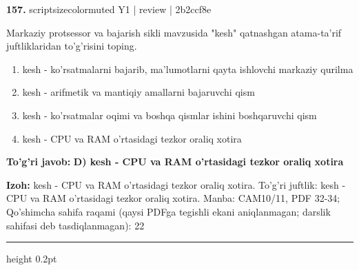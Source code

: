 \documentclass[10pt,a4paper]{article}
\begin{document}
{\bfseries\sffamily\color{ink} 157.} {scriptsizecolor{muted} Y1 | review | 2b2ccf8e}
\par
Markaziy protsessor va bajarish sikli mavzusida "kesh" qatnashgan atama-ta'rif juftliklaridan to'g'risini toping.
\begin{enumerate}[label=\Alph*),leftmargin=9mm]
\item kesh - ko'rsatmalarni bajarib, ma'lumotlarni qayta ishlovchi markaziy qurilma
\item kesh - arifmetik va mantiqiy amallarni bajaruvchi qism
\item kesh - ko'rsatmalar oqimi va boshqa qismlar ishini boshqaruvchi qism
\item kesh - CPU va RAM o'rtasidagi tezkor oraliq xotira
\end{enumerate}
\begin{tcolorbox}[enhanced,breakable,colback=teal!4,colframe=teal!60!black,boxrule=0.45pt,arc=1.2mm,left=2.7mm,right=2.7mm,top=1.8mm,bottom=1.8mm,before skip=2mm,after skip=2mm]
{\bfseries\sffamily\color{teal}To'g'ri javob:} \textbf{D) kesh - CPU va RAM o'rtasidagi tezkor oraliq xotira}
\par\smallskip
{\bfseries Izoh:} kesh - CPU va RAM o'rtasidagi tezkor oraliq xotira. To'g'ri juftlik: kesh - CPU va RAM o'rtasidagi tezkor oraliq xotira. Manba: CAM10/11, PDF 32-34; Qo'shimcha sahifa raqami (qaysi PDFga tegishli ekani aniqlanmagan; darslik sahifasi deb tasdiqlanmagan): 22
\end{tcolorbox}
\vspace{2mm}\hrule height 0.2pt\vspace{3mm}
\end{document}
